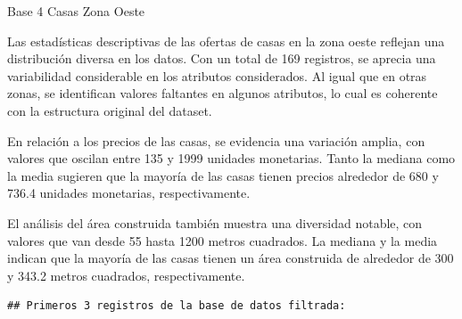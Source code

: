 \documentclass[
]{article}
\begin{document}
Base 4 Casas Zona Oeste

Las estadísticas descriptivas de las ofertas de casas en la zona oeste
reflejan una distribución diversa en los datos. Con un total de 169
registros, se aprecia una variabilidad considerable en los atributos
considerados. Al igual que en otras zonas, se identifican valores
faltantes en algunos atributos, lo cual es coherente con la estructura
original del dataset.

En relación a los precios de las casas, se evidencia una variación
amplia, con valores que oscilan entre 135 y 1999 unidades monetarias.
Tanto la mediana como la media sugieren que la mayoría de las casas
tienen precios alrededor de 680 y 736.4 unidades monetarias,
respectivamente.

El análisis del área construida también muestra una diversidad notable,
con valores que van desde 55 hasta 1200 metros cuadrados. La mediana y
la media indican que la mayoría de las casas tienen un área construida
de alrededor de 300 y 343.2 metros cuadrados, respectivamente.

\begin{verbatim}
## Primeros 3 registros de la base de datos filtrada:
\end{verbatim}
\end{document}
